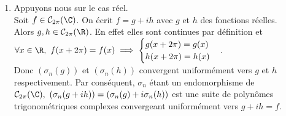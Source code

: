 \documentclass{book}
\begin{document}
\begin{enumerate}[leftmargin=*]
		Ceci démontre que l'ensemble des polynômes trigonométriques réels est dense dans $\mathcal C_{2\pi}(\R)$ pour la norme uniforme.
		\item Appuyons nous sur le cas réel.\\
		Soit $f\in \mathcal C_{2\pi}(\C)$. On écrit $f=g+ih$ avec $g$ et $h$ des fonctions réelles.\\
		Alors $g,h\in \mathcal C_{2\pi}(\R)$. En effet elles sont continues par définition et $\forall x\in \R,\ f(x+2\pi)=f(x)\implies \begin{cases}
			g(x+2\pi)=g(x)\\
			h(x+2\pi)=h(x)
		\end{cases}$.\\
		Donc $(\sigma_n(g))$ et $(\sigma_n(h))$ convergent uniformément vers $g$ et $h$ respectivement. Par conséquent, $\sigma_n$ étant un endomorphisme de $\mathcal C_{2\pi}(\C),\ (\sigma_n(g+ih))=(\sigma_n(g)+i\sigma_n(h))$ est une suite de polynômes trigonométriques complexes convergeant uniformément vers $g+ih=f$.
	\end{enumerate}
	
\end{document}
